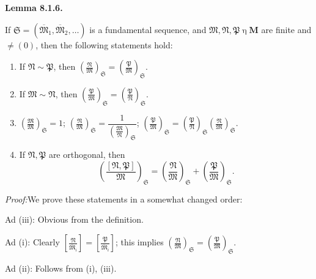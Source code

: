 \documentclass[12pt,b5paper,twoside]{article}
\newcommand{\M}{\mathbf M}
\newcommand{\reldiv}[2]{\left[\frac{#1}{#2}\right]}
\newcommand{\Lemma}[1]{%
  \par\smallskip\noindent\phantomsection\label{lem:#1}\textbf{Lemma #1.}\enspace
}
\newcommand{\Proof}{\par\noindent\textit{Proof:}\enspace}
\begin{document}
\Lemma{8.1.6}
If $\mathfrak S=(\overline{\mathfrak M}_1,\overline{\mathfrak M}_2,\ldots)$
is a fundamental sequence, and $\mathfrak M,\mathfrak N,\mathfrak P
\mathbin\eta\M$ are finite and $\ne(0)$, then the following statements hold:
\begin{enumerate}[label=(\roman*)]
\item If $\mathfrak N\sim\mathfrak P$, then
 $\left(\frac{\mathfrak N}{\mathfrak M}\right)_{\mathfrak S}
 =\left(\frac{\mathfrak P}{\mathfrak M}\right)_{\mathfrak S}$.
\item If $\mathfrak M\sim\mathfrak N$, then
 $\left(\frac{\mathfrak P}{\mathfrak M}\right)_{\mathfrak S}
 =\left(\frac{\mathfrak P}{\mathfrak N}\right)_{\mathfrak S}$.
\item
 $\left(\frac{\mathfrak M}{\mathfrak M}\right)_{\mathfrak S}=1$;
 $\left(\frac{\mathfrak N}{\mathfrak M}\right)_{\mathfrak S}
 =\dfrac{1}{\left(\frac{\mathfrak M}{\mathfrak N}\right)_{\mathfrak S}}$;
 $\left(\frac{\mathfrak P}{\mathfrak M}\right)_{\mathfrak S}
 =\left(\frac{\mathfrak P}{\mathfrak N}\right)_{\mathfrak S}
  \left(\frac{\mathfrak N}{\mathfrak M}\right)_{\mathfrak S}$.
\item If $\mathfrak N,\mathfrak P$ are orthogonal, then
\[
 \left(\frac{[\mathfrak N,\mathfrak P]}{\mathfrak M}\right)_{\mathfrak S}
 =\left(\frac{\mathfrak N}{\mathfrak M}\right)_{\mathfrak S}
 +\left(\frac{\mathfrak P}{\mathfrak M}\right)_{\mathfrak S}.
\]
\end{enumerate}

\Proof We prove these statements in a somewhat changed order:

Ad (iii): Obvious from the definition.

Ad (i): Clearly
$\reldiv{\mathfrak N}{\overline{\mathfrak M}_i}
=\reldiv{\mathfrak P}{\overline{\mathfrak M}_i}$; this implies
$\left(\frac{\mathfrak N}{\mathfrak M}\right)_{\mathfrak S}
=\left(\frac{\mathfrak P}{\mathfrak M}\right)_{\mathfrak S}$.

Ad (ii): Follows from (i), (iii).
\end{document}
